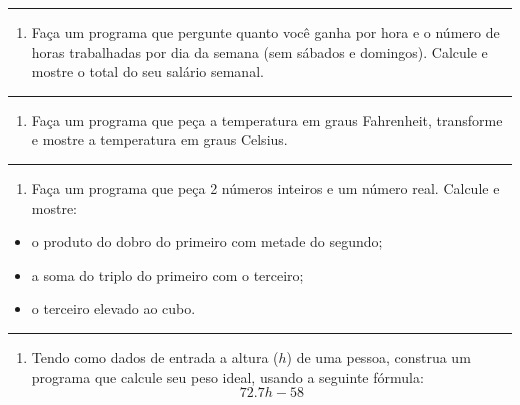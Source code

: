 \documentclass[12pt,a4paper]{article}
\providecommand{\tightlist}{%
      \setlength{\itemsep}{0pt}\setlength{\parskip}{0pt}}
\begin{document}
    \begin{center}\rule{0.5\linewidth}{0.5pt}\end{center}

\begin{enumerate}
\def\labelenumi{\arabic{enumi}.}
\setcounter{enumi}{2}
\tightlist
\item
  Faça um programa que pergunte quanto você ganha por hora e o número de
  horas trabalhadas por dia da semana (sem sábados e domingos). Calcule
  e mostre o total do seu salário semanal.
\end{enumerate}

    \begin{center}\rule{0.5\linewidth}{0.5pt}\end{center}

\begin{enumerate}
\def\labelenumi{\arabic{enumi}.}
\setcounter{enumi}{3}
\tightlist
\item
  Faça um programa que peça a temperatura em graus Fahrenheit,
  transforme e mostre a temperatura em graus Celsius.
\end{enumerate}

    \begin{center}\rule{0.5\linewidth}{0.5pt}\end{center}

\begin{enumerate}
\def\labelenumi{\arabic{enumi}.}
\setcounter{enumi}{4}
\tightlist
\item
  Faça um programa que peça 2 números inteiros e um número real. Calcule
  e mostre:
\end{enumerate}

\begin{itemize}
\tightlist
\item
  o produto do dobro do primeiro com metade do segundo;
\item
  a soma do triplo do primeiro com o terceiro;
\item
  o terceiro elevado ao cubo.
\end{itemize}

    \begin{center}\rule{0.5\linewidth}{0.5pt}\end{center}

\begin{enumerate}
\def\labelenumi{\arabic{enumi}.}
\setcounter{enumi}{5}
\tightlist
\item
  Tendo como dados de entrada a altura (\(h\)) de uma pessoa, construa
  um programa que calcule seu peso ideal, usando a seguinte fórmula:
  \[72.7h - 58\]
\end{enumerate}
\end{document}
